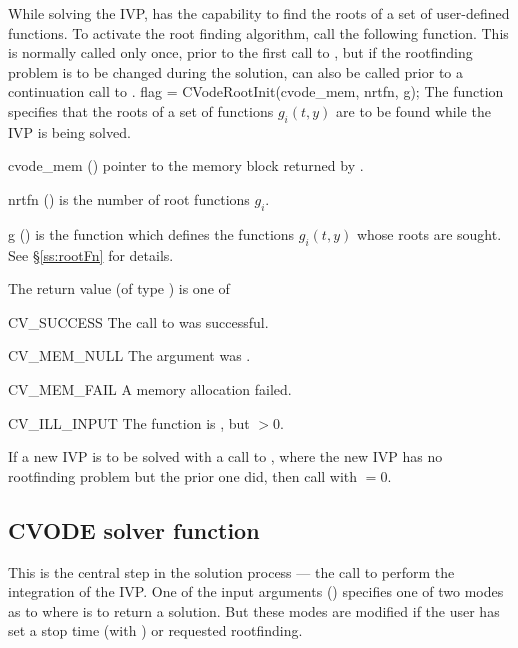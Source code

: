 While solving the IVP, {\cvode} has the capability to find the
roots of a set of user-defined functions. To activate the root finding 
algorithm, call the following function.  This is normally called only
once, prior to the first call to , but if the rootfinding
problem is to be changed during the solution,  can also
be called prior to a continuation call to . 
{
  flag = CVodeRootInit(cvode\_mem, nrtfn, g);
}
{
  The function  specifies that the roots of a set of
  functions $g_i(t,y)$ are to be found while the IVP is being solved.
}
{
  \begin{args}
  \item[cvode\_mem] ()
    pointer to the {\cvode} memory block returned by .
  \item[nrtfn] ()
    is the number of root functions $g_i$.
  \item[g] ()
    is the {\CC} function which defines the  functions $g_i(t,y)$
    whose roots are sought. See \S\ref{ss:rootFn} for details.
 \end{args}
}
{
  The return value  (of type ) is one of
  \begin{args}
  \item[CV\_SUCCESS]
    The call to  was successful.
  \item[CV\_MEM\_NULL]
    The  argument was .
  \item[CV\_MEM\_FAIL]
    A memory allocation failed.
  \item[CV\_ILL\_INPUT]
    The function  is , but  $ > 0$.
  \end{args}
}
{
  If a new IVP is to be solved with a call to , where the new
  IVP has no rootfinding problem but the prior one did, then call
   with $=0$.
}


\subsection{CVODE solver function}\label{sss:cvode}

This is the central step in the solution process --- the call to
perform the integration of the IVP.  One of the input arguments ()
specifies one of two modes as to where {\cvode} is to return a solution.
But these modes are modified if the user has set a stop time (with
) or requested rootfinding.

